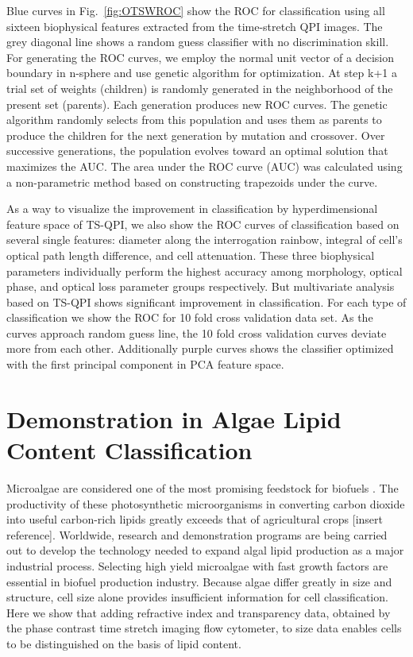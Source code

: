 \documentclass[aps,pra,reprint,superscriptaddress]{revtex4-1}
\begin{document}
Blue curves in Fig.~\ref{fig:OTSWROC} show the ROC for classification using all sixteen biophysical features extracted from the time-stretch QPI images. The grey diagonal line shows a random guess classifier with no discrimination skill. For generating the ROC curves, we employ the normal unit vector of a decision boundary in n-sphere and use genetic algorithm for optimization. At step k+1 a trial set of weights (children) is randomly generated in the neighborhood of the present set (parents). Each generation produces new ROC curves. The genetic algorithm randomly selects from this population and uses them as parents to produce the children for the next generation by mutation and crossover. Over successive generations, the population evolves toward an optimal solution that maximizes the AUC. The area under the ROC curve (AUC) was calculated using a non-parametric method based on constructing trapezoids under the curve.

As a way to visualize the improvement in classification by hyperdimensional feature space of TS-QPI, we also show the ROC curves of classification based on several single features: diameter along the interrogation rainbow, integral of cell's optical path length difference, and cell attenuation. These three biophysical parameters individually perform the highest accuracy among morphology, optical phase, and optical loss parameter groups respectively. But multivariate analysis based on TS-QPI shows significant improvement in classification. For each type of classification we show the ROC for 10 fold cross validation data set. As the curves approach random guess line, the 10 fold cross validation curves deviate more from each other. Additionally purple curves shows the classifier optimized with the first principal component in PCA feature space.

\section{Demonstration in Algae Lipid Content Classification}

Microalgae are considered one of the most promising feedstock for biofuels \cite{merchant2012tag}. The productivity of these photosynthetic microorganisms in converting carbon dioxide into useful carbon-rich lipids greatly exceeds that of agricultural crops [insert reference]. Worldwide, research and demonstration programs are being carried out to develop the technology needed to expand algal lipid production as a major industrial process. Selecting high yield microalgae with fast growth factors are essential in biofuel production industry. Because algae differ greatly in size and structure, cell size alone provides insufficient information for cell classification. Here we show that adding refractive index and transparency data, obtained by the phase contrast time stretch imaging flow cytometer, to size data enables cells to be distinguished on the basis of lipid content. 
\end{document}
